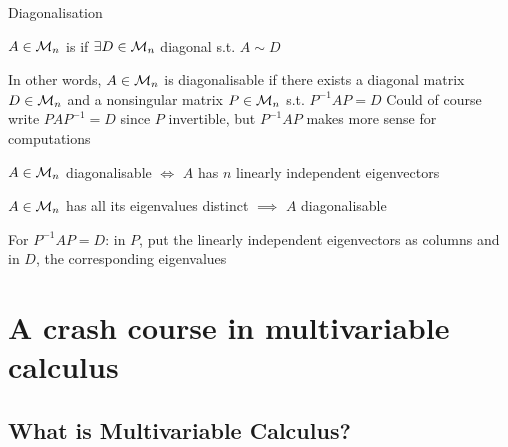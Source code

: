 \documentclass[aspectratio=169]{beamer}\usepackage[]{graphicx}\usepackage[]{xcolor}
\begin{document}
\begin{frame}{Diagonalisation}
\begin{definition}[Diagonalisability]
$A\in\mathcal{M}_n$ is  if $\exists D\in\mathcal{M}_n$ diagonal s.t. $A\sim D$
\end{definition}
\vfill
In other words, $A\in\mathcal{M}_n$ is diagonalisable if there exists a diagonal matrix $D\in\mathcal{M}_n$ and a nonsingular matrix $P\in\mathcal{M}_n$ s.t. $P^{-1}AP=D$
\vfill
Could of course write $PAP^{-1}=D$ since $P$ invertible, but $P^{-1}AP$ makes more sense for computations
\end{frame}


\begin{frame}
\begin{theorem}
$A\in\mathcal{M}_n$ diagonalisable $\iff$ $A$ has $n$ linearly independent eigenvectors
\end{theorem}
\vfill
\begin{corollary}
$A\in\mathcal{M}_n$ has all its eigenvalues distinct $\implies$ $A$ diagonalisable
\end{corollary}
\vfill
For $P^{-1}AP=D$: in $P$, put the linearly independent eigenvectors as columns and in $D$, the corresponding eigenvalues
\end{frame}


\section{A crash course in multivariable calculus}


\subsection{What is Multivariable Calculus?}
\end{document}
